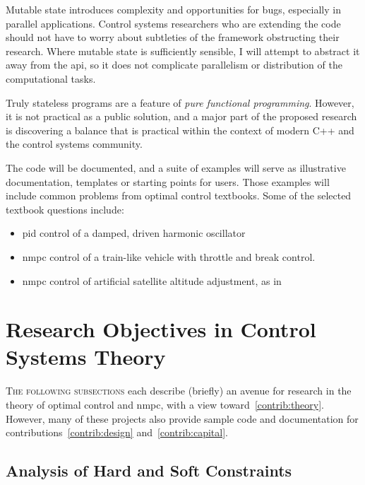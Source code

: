 \begin{description}
  Mutable state introduces complexity and opportunities for bugs, especially in
  parallel applications. Control systems researchers who are extending the code
  should not have to worry about subtleties of the framework obstructing their
  research. Where mutable state is sufficiently sensible, I will attempt to
  abstract it away from the \ac{api}, so it does not complicate parallelism or
  distribution of the computational tasks.

  Truly stateless programs are a feature of \emph{pure functional programming}.
  However, it is not practical as a public solution, and a major part of the
  proposed research is discovering a balance that is practical within the
  context of modern C++ and the control systems community.
\end{description}

The code will be documented, and a suite of examples will serve as illustrative
documentation, templates or starting points for users. Those examples will
include common problems from optimal control textbooks. Some of the selected
textbook questions include:
%
\begin{itemize}
  \item \ac{pid} control of a damped, driven harmonic oscillator
  \item \ac{nmpc} control of a train-like vehicle with throttle and break control.~\cite[p.~5]{Kirk2004}
  \item \ac{nmpc} control of artificial satellite altitude adjustment, as in~\cite[p.~1]{Vinter2010}
\end{itemize}



\section{Research Objectives in Control Systems Theory}%
\label{sec:ObjectivesForControlSystemsTheory}


\textsc{The following subsections} each describe (briefly) an avenue for
research in the theory of optimal control and \ac{nmpc}, with a view
toward~\ref{contrib:theory}. However, many of these projects also provide sample
code and documentation for contributions~\ref{contrib:design}
and~\ref{contrib:capital}.


\subsection{Analysis of Hard and Soft Constraints}

